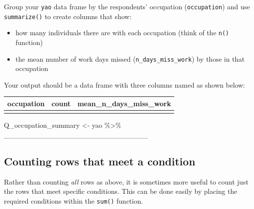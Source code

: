 \documentclass[
  letterpaper,
  DIV=11,
  numbers=noendperiod]{scrreprt}
\newenvironment{Shaded}{\begin{snugshade}}{\end{snugshade}}
\newcommand{\NormalTok}[1]{\textcolor[rgb]{0.00,0.23,0.31}{#1}}
\newcommand{\OtherTok}[1]{\textcolor[rgb]{0.00,0.23,0.31}{#1}}
\newcommand{\SpecialCharTok}[1]{\textcolor[rgb]{0.37,0.37,0.37}{#1}}
\providecommand{\tightlist}{%
  \setlength{\itemsep}{0pt}\setlength{\parskip}{0pt}}\usepackage{longtable,booktabs,array}
\begin{document}
\begin{tcolorbox}[enhanced jigsaw, titlerule=0mm, colback=white, left=2mm, breakable, opacitybacktitle=0.6, colbacktitle=quarto-callout-tip-color!10!white, colframe=quarto-callout-tip-color-frame, bottomtitle=1mm, opacityback=0, coltitle=black, arc=.35mm, toptitle=1mm, title=\textcolor{quarto-callout-tip-color}{\faLightbulb}\hspace{0.5em}{Practice}, leftrule=.75mm, toprule=.15mm, bottomrule=.15mm, rightrule=.15mm]

Group your \texttt{yao} data frame by the respondents' occupation
(\texttt{occupation}) and use \texttt{summarize()} to create columns
that show:

\begin{itemize}
\tightlist
\item
  how many individuals there are with each occupation (think of the
  \texttt{n()} function)
\item
  the mean number of work days missed (\texttt{n\_days\_miss\_work}) by
  those in that occupation
\end{itemize}

Your output should be a data frame with three columns named as shown
below:

\begin{longtable}[]{@{}lll@{}}
\toprule\noalign{}
occupation & count & mean\_n\_days\_miss\_work \\
\midrule\noalign{}
\endhead
\bottomrule\noalign{}
\endlastfoot
& & \\
\end{longtable}

\begin{Shaded}
\begin{Highlighting}[]
\NormalTok{Q\_occupation\_summary }\OtherTok{\textless{}{-}} 
\NormalTok{  yao }\SpecialCharTok{\%\textgreater{}\%}
\NormalTok{  \_\_\_\_\_\_\_\_\_\_\_\_\_\_\_\_\_\_\_\_\_\_\_\_\_\_\_\_}
\end{Highlighting}
\end{Shaded}

\end{tcolorbox}

\subsection{Counting rows that meet a
condition}\label{counting-rows-that-meet-a-condition}

Rather than counting \emph{all} rows as above, it is sometimes more
useful to count just the rows that meet specific conditions. This can be
done easily by placing the required conditions within the \texttt{sum()}
function.
\end{document}
